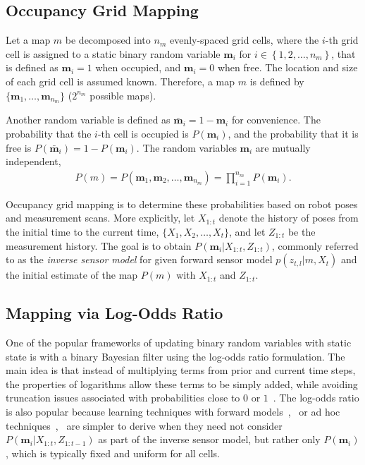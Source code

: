 \documentclass[letterpaper, 10pt, conference]{ieeeconf}
\newcommand{\braces}[1]{\ensuremath{\left\{ #1 \right\}}}
\begin{document}
	
\subsection{Occupancy Grid Mapping}

Let a map $m$ be decomposed into $n_m$ evenly-spaced grid cells, where the $i$-th grid cell is assigned to a static binary random variable $\mathbf{m}_i$ for $i\in\braces{1,2,\ldots,n_m}$, that is defined as $\mathbf{m}_i=1$ when occupied, and $\mathbf{m}_i=0$ when free. The location and size of each grid cell is assumed known. Therefore, a map $m$ is defined by $\{\mathbf{m}_1,\ldots, \mathbf{m}_{n_m}\}$ ($2^{n_{m}}$ possible maps). 

Another random variable is defined as $\bar{\mathbf{m}}_i=1-\mathbf{m}_i$ for convenience. The probability that the $i$-th cell is occupied is $P(\mathbf{m}_i)$, and the probability that it is free is $P(\bar{\mathbf{m}}_i)=1-P(\mathbf{m}_i)$. The random variables $\mathbf{m}_i$ are mutually independent, 
\begin{align}
P(m)=P(\mathbf{m}_1,\mathbf{m}_2,\ldots,\mathbf{m}_{n_m})=\prod_{i=1}^{n_m}P(\mathbf{m}_i).
\end{align}

Occupancy grid mapping  is to determine these probabilities based on robot poses and measurement scans. More explicitly, let $X_{1:t}$ denote the history of poses from the initial time to the current time, $\{X_1,X_2,\ldots, X_t\}$, and let $Z_{1:t}$ be the measurement history. The goal is to obtain $P(\mathbf{m}_i|X_{1:t},Z_{1:t})$, commonly referred to as the \emph{inverse sensor model} for given forward sensor model $p(z_{t,l}|m,X_t)$ and the initial estimate of the map $P(m)$ with $X_{1:t}$ and $Z_{1:t}$.

	
\subsection{Mapping via Log-Odds Ratio}

One of the popular frameworks of updating binary random variables with static state is with a binary Bayesian filter using the log-odds ratio formulation.
The main idea is that instead of multiplying terms from prior and current time steps, the properties of logarithms allow these terms to be simply added, while avoiding truncation issues associated with probabilities close to $0$ or $1$~\cite{ThrBurFox05}.
The log-odds ratio is also popular because learning techniques with forward models~\cite{Thr01},~\cite{Thr03} or ad hoc techniques~\cite{MorElf85},~\cite{Elf89} are simpler to derive when they need not consider $P(\mathbf{m}_i|X_{1:t},Z_{1:t-1})$ as part of the inverse sensor model, but rather only $P(\mathbf{m}_i)$, which is typically fixed and uniform for all cells.
\end{document}
